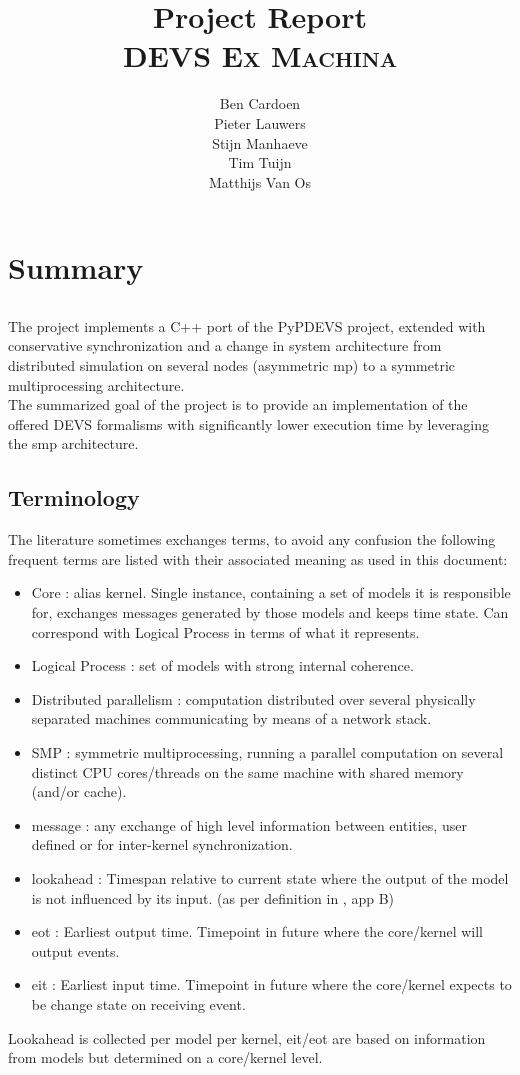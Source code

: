 \documentclass[8pt,a4paper]{report}
\title{Project Report\\\textsc{DEVS Ex Machina}}
\author{Ben Cardoen\\Pieter Lauwers\\Stijn Manhaeve\\Tim Tuijn\\Matthijs Van Os}
\date{}
\begin{document}
\maketitle
\tableofcontents{}

%
\chapter{Summary}
%
\section*{}
The project implements a C++ port of the PyPDEVS project, extended with conservative synchronization and a change in system architecture from distributed simulation on several nodes (asymmetric mp) to a symmetric multiprocessing architecture. \\The summarized goal of the project is to provide an implementation of the offered DEVS formalisms with significantly lower execution time by leveraging the smp architecture.

\section*{Terminology}
The literature sometimes exchanges terms, to avoid any confusion the following frequent terms are listed with their associated meaning as used in this document:
\begin{itemize}
  \item Core : alias kernel. Single instance, containing a set of models it is responsible for, exchanges messages generated by those models and keeps time state. Can correspond with Logical Process in terms of what it represents.
  \item Logical Process : set of models with strong internal coherence.
  \item Distributed parallelism : computation distributed over several physically separated machines communicating by means of a network stack.
  \item SMP : symmetric multiprocessing, running a parallel computation on several distinct CPU cores/threads on the same machine with shared memory (and/or cache).
  \item message : any exchange of high level information between entities, user defined or for inter-kernel synchronization.
  \item lookahead : Timespan relative to current state where the output of the model is not influenced by its input. (as per definition in \cite{cons}, app B)
  \item eot : Earliest output time. Timepoint in future where the core/kernel will output events.
  \item eit : Earliest input time. Timepoint in future where the core/kernel expects to
  be change state on receiving event.
\end{itemize}
Lookahead is collected per model per kernel, eit/eot are based on information from models but determined on a core/kernel level.
\end{document}
